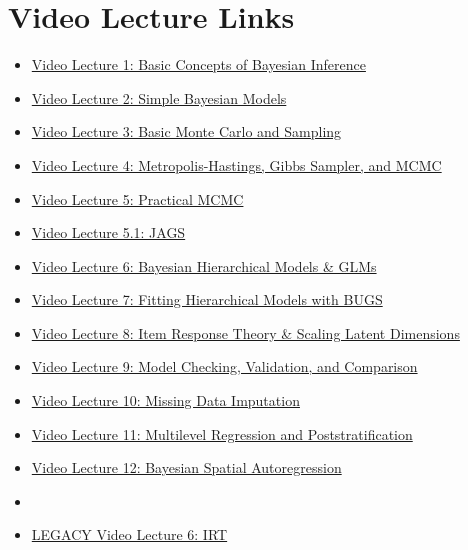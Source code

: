 \documentclass[11pt, leqno, fleqn]{article}
\begin{document}
\section*{Video Lecture Links}
\vspace{10pt}
\begin{itemize}
\item[] \href{http://youtu.be/BOWNHl3qOVA}{Video Lecture 1: Basic Concepts of Bayesian Inference} \\
\item[] \href{http://youtu.be/ps5MYi81IsE}{Video Lecture 2: Simple Bayesian Models} \\
\item[] \href{http://youtu.be/cxWzsCoYT8Q}{Video Lecture 3: Basic Monte Carlo and Sampling} \\
\item[] \href{http://youtu.be/j4nEAqUUnVw}{Video Lecture 4: Metropolis-Hastings, Gibbs Sampler, and MCMC} \\
\item[] \href{http://youtu.be/bGKgkK9vETQ}{Video Lecture 5: Practical MCMC} \\
\item[] \href{http://youtu.be/-89nkSHsFV4}{Video Lecture 5.1: JAGS}\\
\item[] \href{http://youtu.be/tbQkKu01kb8}{Video Lecture 6: Bayesian Hierarchical Models \& GLMs} \\
\item[] \href{}{Video Lecture 7: Fitting Hierarchical Models with BUGS} \\
\item[] \href{}{Video Lecture 8: Item Response Theory \& Scaling Latent Dimensions} \\
\item[] \href{}{Video Lecture 9: Model Checking, Validation, and Comparison} \\
\item[] \href{}{Video Lecture 10: Missing Data Imputation} \\
\item[] \href{}{Video Lecture 11: Multilevel Regression and Poststratification} \\
\item[] \href{}{Video Lecture 12: Bayesian Spatial Autoregression} \\
\item[]
\item[] \href{http://youtu.be/dfPq_WTFzQ0}{LEGACY Video Lecture 6: IRT} \\

\end{itemize}
\end{document}
